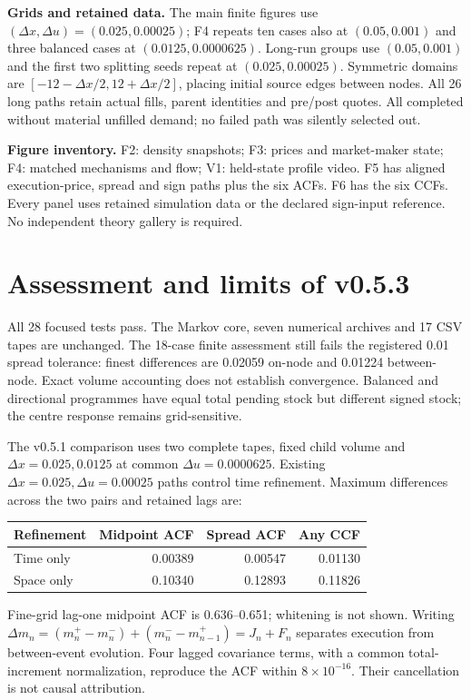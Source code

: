\documentclass[11pt,a4paper]{article}
\newcommand{\du}{\Delta u}\newcommand{\dx}{\Delta x}
\begin{document}
\textbf{Grids and retained data.} The main finite figures use
$(\dx,\du)=(0.025,0.00025)$; F4 repeats ten cases also at $(0.05,0.001)$
and three balanced cases at $(0.0125,0.0000625)$.
Long-run groups use $(0.05,0.001)$ and the first two splitting seeds repeat
at $(0.025,0.00025)$. Symmetric domains are $[-12-\dx/2,12+\dx/2]$,
placing initial source edges between nodes. All 26 long paths retain
actual fills, parent identities and pre/post quotes. All completed without
material unfilled demand; no failed path was silently selected out.

\textbf{Figure inventory.} F2: density snapshots; F3: prices and market-maker
state; F4: matched mechanisms and flow; V1: held-state profile video.
F5 has aligned execution-price, spread and sign paths plus the six ACFs.
F6 has the six CCFs. Every panel uses retained simulation data or the
declared sign-input reference. No independent theory gallery is required.

\newpage
\section{Assessment and limits of v0.5.3}
All 28 focused tests pass. The Markov core, seven numerical archives and
17 CSV tapes are unchanged. The 18-case finite assessment still fails the
registered 0.01 spread tolerance: finest differences are 0.02059 on-node
and 0.01224 between-node. Exact volume accounting does not establish
convergence. Balanced and directional programmes have equal total pending
stock but different signed stock; the centre response remains grid-sensitive.

The v0.5.1 comparison uses two complete tapes, fixed child
volume and $\dx=0.025,0.0125$ at common $\du=0.0000625$. Existing
$\dx=0.025,\du=0.00025$ paths control time refinement. Maximum differences
across the two pairs and retained lags are:
\begin{center}
\begin{tabular}{lrrr}
\toprule
Refinement & Midpoint ACF & Spread ACF & Any CCF\\
\midrule
Time only & 0.00389 & 0.00547 & 0.01130\\
Space only & 0.10340 & 0.12893 & 0.11826\\
\bottomrule
\end{tabular}
\end{center}
Fine-grid lag-one midpoint ACF is 0.636--0.651; whitening is not shown.
Writing $\Delta m_n=(m_n^+-m_n^-)+(m_n^--m_{n-1}^+)=J_n+F_n$
separates execution from between-event evolution. Four lagged covariance
terms, with a common total-increment normalization, reproduce the ACF
within $8\times10^{-16}$. Their cancellation is not causal attribution.
\end{document}
